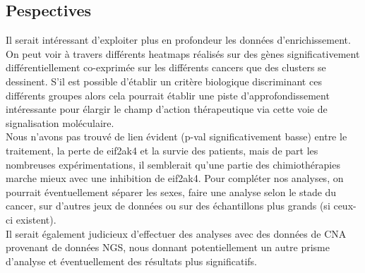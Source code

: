 \documentclass{style}
\begin{document}
\subsection{Pespectives}
Il serait intéressant d’exploiter plus en profondeur les données d’enrichissement. On peut voir à travers différents heatmaps réalisés sur des gènes significativement différentiellement co-exprimée sur les différents cancers que des clusters se dessinent. S’il est possible d’établir un critère biologique discriminant ces différents groupes alors cela pourrait établir une piste d’approfondissement intéressante pour élargir le champ d’action thérapeutique via cette voie de signalisation moléculaire. \\
Nous n’avons pas trouvé de lien évident (p-val significativement basse) entre le traitement, la perte de eif2ak4 et la survie des patients, mais de part les nombreuses expérimentations, il semblerait qu’une partie des chimiothérapies marche mieux avec une inhibition de eif2ak4. Pour compléter nos analyses, on pourrait éventuellement séparer les sexes, faire une analyse selon le stade du cancer, sur d’autres jeux de données ou sur des échantillons plus grands (si ceux-ci existent). \\
Il serait également judicieux d’effectuer des analyses avec des données de CNA provenant de données NGS, nous donnant potentiellement un autre prisme d’analyse et éventuellement des résultats plus significatifs. \\

\newpage
\end{document}
